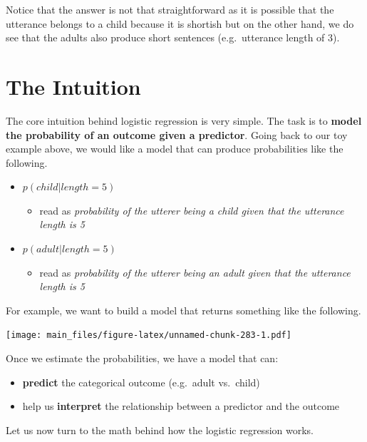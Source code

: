 \documentclass[
]{book}
\providecommand{\tightlist}{%
  \setlength{\itemsep}{0pt}\setlength{\parskip}{0pt}}
\begin{document}
Notice that the answer is not that straightforward as it is possible that the utterance belongs to a child because it is shortish but on the other hand, we do see that the adults also produce short sentences (e.g.~utterance length of 3).

\section{The Intuition}\label{the-intuition}

The core intuition behind logistic regression is very simple. The task is to \textbf{model the probability of an outcome given a predictor}. Going back to our toy example above, we would like a model that can produce probabilities like the following.

\begin{itemize}
\tightlist
\item
  \(p(child | length = 5)\)

  \begin{itemize}
  \tightlist
  \item
    read as \emph{probability of the utterer being a child given that the utterance length is 5}
    \\
  \end{itemize}
\item
  \(p(adult | length = 5)\)

  \begin{itemize}
  \tightlist
  \item
    read as \emph{probability of the utterer being an adult given that the utterance length is 5}
  \end{itemize}
\end{itemize}

For example, we want to build a model that returns something like the following.

\texttt{[image: main\_files/figure-latex/unnamed-chunk-283-1.pdf]}

Once we estimate the probabilities, we have a model that can:

\begin{itemize}
\tightlist
\item
  \textbf{predict} the categorical outcome (e.g.~adult vs.~child)
\item
  help us \textbf{interpret} the relationship between a predictor and the outcome
\end{itemize}

Let us now turn to the math behind how the logistic regression works.
\end{document}

